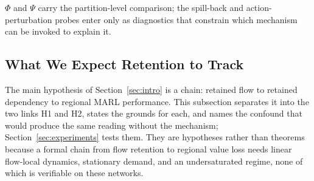 \documentclass[journal]{IEEEtran}
\theoremstyle{definition}
\begin{document}
$\Phi$ and $\Psi$ carry the partition-level comparison; the spill-back and action-perturbation probes enter only as diagnostics that constrain which mechanism can be invoked to explain it.

\subsection{What We Expect Retention to Track}
\label{sec:transfer}

The main hypothesis of Section~\ref{sec:intro} is a chain: retained flow to retained dependency to regional MARL performance. This subsection separates it into the two links H1 and H2, states the grounds for each, and names the confound that would produce the same reading without the mechanism; Section~\ref{sec:experiments} tests them. They are hypotheses rather than theorems because a formal chain from flow retention to regional value loss needs linear flow-local dynamics, stationary demand, and an undersaturated regime, none of which is verifiable on these networks.
\end{document}
